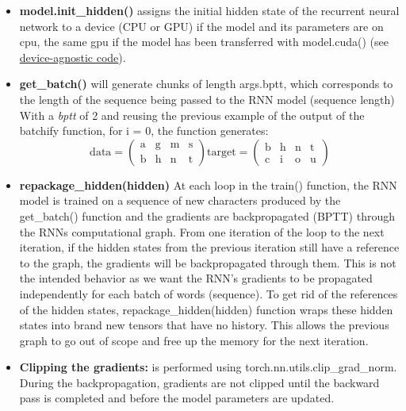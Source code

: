 \documentclass[11pt]{article}
\newcommand{\0}{\mat{0}}
\begin{document}
\begin{itemize}
\begin{itemize}
	\item \textbf{model.init\_hidden()}  assigns the initial hidden state of the recurrent neural network to a device (CPU or GPU)
	if the model and its parameters are on cpu, the same gpu if the model has been transferred with model.cuda()
	(see \href{https://github.com/pytorch/pytorch/blob/master/docs/source/notes/cuda.rst}{device-agnostic code}).
	\item \textbf{get\_batch()} will  generate chunks of length args.bptt, which corresponds to the length of the sequence being passed to the RNN model (sequence length) 
	With a \textit{bptt} of 2 and reusing the previous example of the output of the batchify function, for i = 0, the function generates: 
	\[ \text{data}=\left(  \begin{array}{cccc}
			\text{a} &  \text{g} & \text{m} & \text{s}  \\
			\text{b}  &  \text{h} & \text{n} & \text{t}
		   \end{array} \right)
	 \text{target}=\left(\begin{array}{cccc}
			 \text{b}  &  \text{h} & \text{n} & \text{t} \\
			\text{c}  &  \text{i} & \text{o} & \text{u}
		\end{array} \right)
	\]
	\item \textbf{repackage\_hidden(hidden)}  At each loop in the train() function, the RNN model is trained on a sequence of new characters produced by the  get\_batch() function and the gradients are backpropagated (BPTT) through the RNNs computational graph. From one iteration of the loop to the next iteration, if the hidden states from the previous iteration still have a reference to the graph, the gradients will be backpropagated through them. This is not the intended behavior as we want the RNN's gradients to be propagated independently for each batch of words (sequence). To get rid of the references of the hidden states, repackage\_hidden(hidden) function wraps these hidden states into brand new tensors that have no history. This allows the previous graph to go out of scope and free up the memory for the next iteration.
	\item \textbf{Clipping the gradients:} is performed using  torch.nn.utils.clip\_grad\_norm. During the backpropagation, gradients are not clipped until the backward pass is completed and before the model parameters are updated.
	\end{itemize}
		   
         \begin{center}
         \begin{tikzpicture}[node distance = 2cm, auto]
        

\end{tikzpicture}
\end{center}
\end{itemize}
\end{document}
